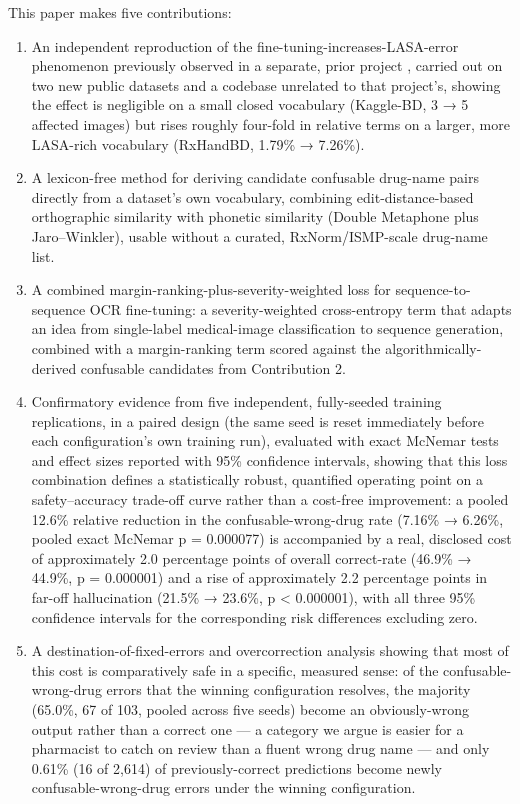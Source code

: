 \documentclass[fleqn,10pt]{wlpeerj}
\providecommand{\tightlist}{\setlength{\itemsep}{0pt}\setlength{\parskip}{0pt}}
\begin{document}
This paper makes five contributions:

\begin{enumerate}
\def\labelenumi{\arabic{enumi}.}
\tightlist
\item
  An independent reproduction of the fine-tuning-increases-LASA-error phenomenon previously observed in a separate, prior project \citep[manuscript submitted for publication]{dang2026zeroshot}, carried out on two new public datasets and a codebase unrelated to that project's, showing the effect is negligible on a small closed vocabulary (Kaggle-BD, 3 → 5 affected images) but rises roughly four-fold in relative terms on a larger, more LASA-rich vocabulary (RxHandBD, 1.79\% → 7.26\%).
\item
  A lexicon-free method for deriving candidate confusable drug-name pairs directly from a dataset's own vocabulary, combining edit-distance-based orthographic similarity with phonetic similarity (Double Metaphone plus Jaro--Winkler), usable without a curated, RxNorm/ISMP-scale drug-name list.
\item
  A combined margin-ranking-plus-severity-weighted loss for sequence-to-sequence OCR fine-tuning: a severity-weighted cross-entropy term that adapts an idea from single-label medical-image classification \citep{mohammadiseif2026risk} to sequence generation, combined with a margin-ranking term scored against the algorithmically-derived confusable candidates from Contribution 2.
\item
  Confirmatory evidence from five independent, fully-seeded training replications, in a paired design (the same seed is reset immediately before each configuration's own training run), evaluated with exact McNemar tests and effect sizes reported with 95\% confidence intervals, showing that this loss combination defines a statistically robust, quantified operating point on a safety--accuracy trade-off curve rather than a cost-free improvement: a pooled 12.6\% relative reduction in the confusable-wrong-drug rate (7.16\% → 6.26\%, pooled exact McNemar p = 0.000077) is accompanied by a real, disclosed cost of approximately 2.0 percentage points of overall correct-rate (46.9\% → 44.9\%, p = 0.000001) and a rise of approximately 2.2 percentage points in far-off hallucination (21.5\% → 23.6\%, p \textless{} 0.000001), with all three 95\% confidence intervals for the corresponding risk differences excluding zero.
\item
  A destination-of-fixed-errors and overcorrection analysis showing that most of this cost is comparatively safe in a specific, measured sense: of the confusable-wrong-drug errors that the winning configuration resolves, the majority (65.0\%, 67 of 103, pooled across five seeds) become an obviously-wrong output rather than a correct one --- a category we argue is easier for a pharmacist to catch on review than a fluent wrong drug name --- and only 0.61\% (16 of 2,614) of previously-correct predictions become newly confusable-wrong-drug errors under the winning configuration.
\end{enumerate}
\end{document}
